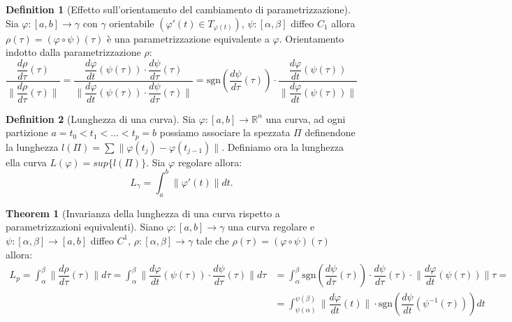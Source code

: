 \documentclass[leqno]{article}
\theoremstyle{definition}
\newtheorem{definition}{Definition}[section]
\numberwithin{equation}{section}
\newtheorem{theorem}{Theorem}[section]
\theoremstyle{remark}
\begin{document}
	\begin{definition}[Effetto sull'orientamento del cambiamento di parametrizzazione]
		Sia $\varphi : [a,b] \to \gamma$ con $\gamma$ orientabile $(\varphi '(t)\in T_{\varphi(t)})$,  $\psi: [\alpha,\beta]$ diffeo $C_1$ allora $\rho(\tau)=(\varphi \circ \psi)(\tau)$ è una parametrizzazione equivalente a $\varphi$. Orientamento indotto dalla parametrizzazione $\rho:$
		\begin{equation}
			\dfrac{\dfrac{d \rho }{d \tau} (\tau)}{\lVert \dfrac{d \rho}{d \tau}(\tau)\rVert}= \dfrac{ \dfrac{d \varphi }{ dt } (\psi ( \tau ))  \cdot \dfrac{d \psi }{d \tau }( \tau )  }{\lVert  \dfrac{d \varphi }{ dt } (\psi ( \tau ))  \cdot \dfrac{d \psi }{d \tau }( \tau ) \rVert}=\text{sgn} \left( \dfrac{d \psi }{d \tau }( \tau )\right) \cdot \dfrac{ \dfrac{d \varphi }{ dt } (\psi ( \tau ))}{\lVert \dfrac{d \varphi }{ dt } (\psi ( \tau ))\rVert}
		\end{equation}
	\end{definition}
	
	\begin{definition}[Lunghezza di una curva]
		Sia $\varphi : [a,b] \to \mathbb{R}^n$ una curva, ad ogni partizione $a = t_0 < t_1 < \dots < t_p = b$ possiamo associare la spezzata $\Pi$ definendone la lunghezza $l(\Pi)=\sum \lVert \varphi(t_j)-\varphi(t_{j-1}) \rVert$. Definiamo ora la lunghezza ella curva $L(\varphi)=sup\{l(\Pi)\}$.
		Sia $\varphi$ regolare allora:
		\begin{equation}
			L_{\gamma}=\int_a^b\lVert \varphi '(t)\rVert dt.
		\end{equation}    
	\end{definition}
	
	\begin{theorem}[Invarianza della lunghezza di una curva rispetto a parametrizzazioni equivalenti]
		Siano $\varphi : [a,b] \to \gamma$ una curva regolare e $\psi : [\alpha, \beta] \to [a,b]$ diffeo $C^1$,  $\rho : [\alpha,\beta]\to \gamma$ tale che $\rho(\tau)=(\varphi \circ \psi)(\tau)$ allora:   
		\begin{equation}
			\begin{aligned}
				L_p=\int_{\alpha}^{\beta} \lVert \dfrac{d \rho}{d \tau}(\tau)\rVert d\tau= \int_{\alpha}^{\beta} \lVert  \dfrac{d \varphi }{ dt } (\psi ( \tau ))  \cdot \dfrac{d \psi }{d \tau }( \tau ) \rVert d\tau &= \int_{\alpha}^{\beta} \text{sgn}\left( \dfrac{d\psi}{d\tau}(\tau)\right) \cdot \dfrac{d\psi}{d\tau}(\tau) \cdot \lVert \dfrac{d \varphi }{ dt } (\psi ( \tau ))\rVert\tau= \\
				&=\int_{\psi(\alpha)}^{\psi(\beta)}\lVert \dfrac{d \varphi}{dt}(t)\rVert\cdot \text{sgn}\left(\dfrac{d\psi}{dt}(\psi^{-1}(\tau))\right)dt 
			\end{aligned}
		\end{equation}
	\end{theorem}
	
\end{document}
